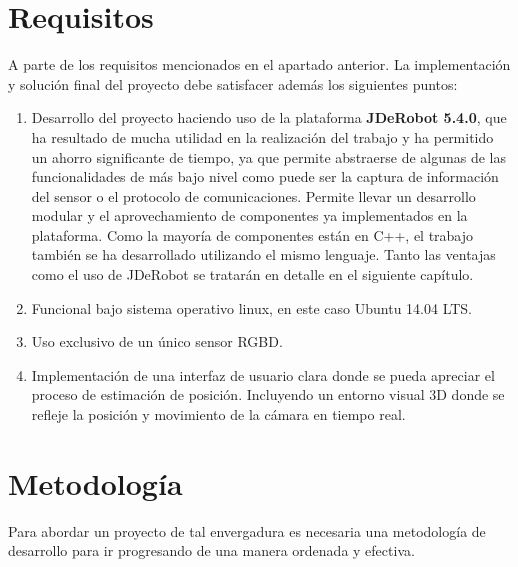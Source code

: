 \section{Requisitos}

A parte de los requisitos mencionados en el apartado anterior. La implementación y solución final del proyecto debe satisfacer además los siguientes puntos:

\begin{enumerate}

\item Desarrollo del proyecto haciendo uso de la plataforma \textbf{JDeRobot 5.4.0}, que ha resultado de mucha utilidad en la realización del trabajo y ha permitido un ahorro significante de tiempo, ya que permite abstraerse de algunas de las funcionalidades de más bajo nivel como puede ser la captura de información del sensor o el protocolo de comunicaciones. Permite llevar un desarrollo modular y el aprovechamiento de componentes ya implementados en la plataforma. Como la mayoría de componentes están en C++, el trabajo también se ha desarrollado utilizando el mismo lenguaje. Tanto las ventajas como el uso de JDeRobot se tratarán en detalle en el siguiente capítulo.

\item Funcional bajo sistema operativo linux, en este caso Ubuntu 14.04 LTS.

\item Uso exclusivo de un único sensor RGBD.

\item Implementación de una interfaz de usuario clara donde se pueda apreciar el proceso de estimación de posición. Incluyendo un entorno visual 3D donde se refleje la posición y movimiento de la cámara en tiempo real.

\end{enumerate}


\section{Metodología}

Para abordar un proyecto de tal envergadura es necesaria una metodología de desarrollo para ir progresando de una manera ordenada y efectiva.

